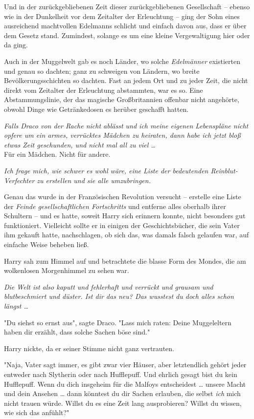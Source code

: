 {Und in der zurückgebliebenen Zeit dieser zurückgebliebenen Gesellschaft -- ebenso wie in der Dunkelheit vor dem Zeitalter der Erleuchtung -- ging der Sohn eines ausreichend machtvollen Edelmanns schlicht und einfach davon aus, dass er über dem Gesetz stand. Zumindest, solange es um eine kleine Vergewaltigung hier oder da ging.

Auch in der Muggelwelt gab es noch Länder, wo solche \emph{Edelmänner} existierten und genau so dachten; ganz zu schweigen von Ländern, wo breite Bevölkerungsschichten so dachten. Fast an jedem Ort und zu jeder Zeit, die nicht direkt vom Zeitalter der Erleuchtung abstammten, war es so. Eine Abstammungslinie, der das magische Großbritannien offenbar nicht angehörte, obwohl Dinge wie Getränkedosen es herüber geschafft hatten.

\emph{Falls Draco von der Rache nicht ablässt und ich meine eigenen Lebenspläne nicht opfere um ein armes, verrücktes Mädchen zu heiraten, dann habe ich jetzt bloß etwas Zeit geschunden, und nicht mal all zu viel …}\\ Für ein Mädchen. Nicht für andere.

\emph{Ich frage mich, wie schwer es wohl wäre, eine Liste der bedeutenden Reinblut-Verfechter zu erstellen und sie alle umzubringen.}

Genau das wurde in der Französischen Revolution versucht -- erstelle eine Liste der \emph{Feinde gesellschaftlichen Fortschritts} und entferne alles oberhalb ihrer Schultern -- und es hatte, soweit Harry sich erinnern konnte, nicht besonders gut funktioniert. Vielleicht sollte er in einigen der Geschichtsbücher, die sein Vater ihm gekauft hatte, nachschlagen, ob sich das, was damals falsch gelaufen war, auf einfache Weise beheben ließ.

Harry sah zum Himmel auf und betrachtete die blasse Form des Mondes, die am wolkenlosen Morgenhimmel zu sehen war.

\emph{Die Welt ist also kaputt und fehlerhaft und verrückt und grausam und blutbeschmiert und düster. Ist dir das neu? Das wusstest du doch alles schon längst …}

"Du siehst so ernst aus", sagte Draco. "Lass mich raten: Deine Muggeleltern haben dir erzählt, dass solche Sachen böse sind."

Harry nickte, da er seiner Stimme nicht ganz vertrauten.

"Naja, Vater sagt immer, es gibt zwar vier Häuser, aber letztendlich gehört jeder entweder nach Slytherin oder nach Hufflepuff. Und ehrlich gesagt bist du kein Hufflepuff. Wenn du dich insgeheim für die Malfoys entscheidest … unsere Macht und dein Ansehen … dann könntest du dir Sachen erlauben, die selbst \emph{ich} mich nicht trauen würde. Willst du es eine Zeit lang ausprobieren? Willst du wissen, wie sich das anfühlt?"

}
